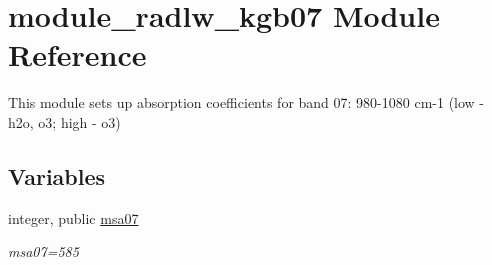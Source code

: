 \hypertarget{namespacemodule__radlw__kgb07}{}\section{module\+\_\+radlw\+\_\+kgb07 Module Reference}
\label{namespacemodule__radlw__kgb07}


This module sets up absorption coefficients for band 07\+: 980-\/1080 cm-\/1 (low -\/ h2o, o3; high -\/ o3)  


\subsection*{Variables}
\begin{DoxyCompactItemize}
\item 
\mbox{\label{namespacemodule__radlw__kgb07_a0acb84a6b261fc00f1765707844c32f2}} 
integer, public \hyperlink{namespacemodule__radlw__kgb07_a0acb84a6b261fc00f1765707844c32f2}{msa07}
\begin{DoxyCompactList}\small\item\em msa07=585 \end{DoxyCompactList}\end{DoxyCompactItemize}
